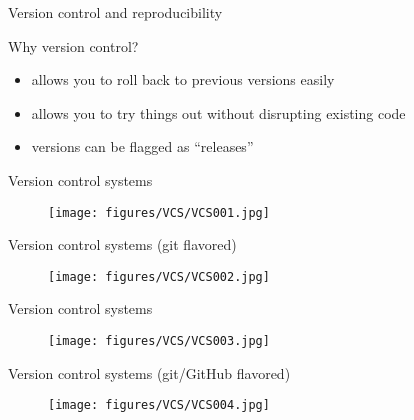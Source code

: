 \documentclass[table]{beamer}\usepackage[]{graphicx}\usepackage[]{color}
\begin{document}
\begin{frame}{Version control and reproducibility}


\begin{block}{Why version control?}

\begin{itemize}
        \item allows you to roll back to previous versions easily
        \item allows you to try things out without disrupting existing code
        \item versions can be flagged as ``releases''  
\end{itemize}
\end{block}

\end{frame}

\begin{frame}{Version control systems}

\begin{figure}[t]
    \texttt{[image: figures/VCS/VCS001.jpg]}  
\end{figure}

\end{frame}

\begin{frame}{Version control systems (git flavored)}

\begin{figure}[t]
    \texttt{[image: figures/VCS/VCS002.jpg]}  
\end{figure}

\end{frame}

\begin{frame}{Version control systems}

\begin{figure}[t]
    \texttt{[image: figures/VCS/VCS003.jpg]}  
\end{figure}

\end{frame}

\begin{frame}{Version control systems  (git/GitHub flavored)}

\begin{figure}[t]
    \texttt{[image: figures/VCS/VCS004.jpg]}  
\end{figure}

\end{frame}
\end{document}
